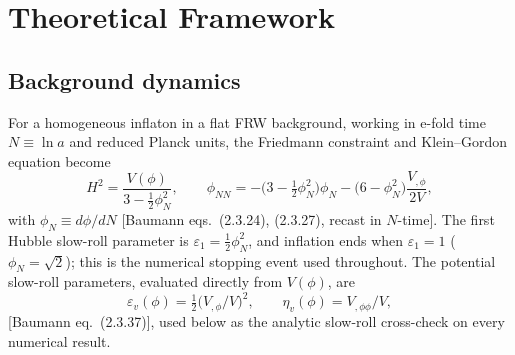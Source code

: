 \documentclass[11pt]{article}
\begin{document}
\section{Theoretical Framework}

\subsection{Background dynamics}
For a homogeneous inflaton in a flat FRW background, working in e-fold time
$N\equiv\ln a$ and reduced Planck units, the Friedmann constraint and Klein--Gordon
equation become
\begin{equation}
H^2=\frac{V(\phi)}{3-\tfrac12\phi_N^2},\qquad
\phi_{NN}=-\Big(3-\tfrac12\phi_N^2\Big)\phi_N-\Big(6-\phi_N^2\Big)\frac{V_{,\phi}}{2V},
\label{eq:bg}
\end{equation}
with $\phi_N\equiv d\phi/dN$ [Baumann eqs.\ (2.3.24), (2.3.27), recast in $N$-time].
The first Hubble slow-roll parameter is $\varepsilon_1=\tfrac12\phi_N^2$, and inflation
ends when $\varepsilon_1=1$ ($\phi_N=\sqrt2$); this is the numerical stopping event used
throughout. The potential slow-roll parameters, evaluated directly from $V(\phi)$, are
\begin{equation}
\varepsilon_v(\phi)=\tfrac12\big(V_{,\phi}/V\big)^2,\qquad
\eta_v(\phi)=V_{,\phi\phi}/V,
\label{eq:sr}
\end{equation}
[Baumann eq.\ (2.3.37)], used below as the analytic slow-roll cross-check on every
numerical result.
\end{document}
